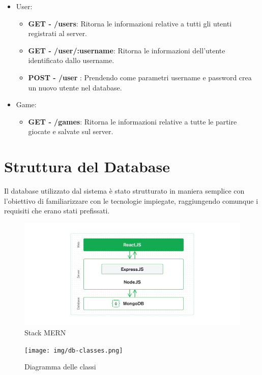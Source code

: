 \begin{itemize}
    \item User:
    \begin{itemize}
        \item \textbf{GET - /users}: Ritorna le informazioni relative a tutti gli utenti registrati al server.
        \item \textbf{GET - /user/:username}: Ritorna le informazioni dell'utente identificato dallo username.
        \item \textbf{POST - /user} : Prendendo come parametri username e password crea un nuovo utente nel database.
    \end{itemize}
    \item Game:
    \begin{itemize}
        \item \textbf{GET - /games}: Ritorna le informazioni relative a tutte le partire giocate e salvate sul server.
    \end{itemize}
            
\end{itemize}


\newpage
\section{Struttura del Database}
Il database utilizzato dal sistema è stato strutturato in maniera semplice con l'obiettivo di familiarizzare con le tecnologie impiegate, raggiungendo comunque i requisiti che erano stati prefissati.\\

\begin{figure}[H]
\centering
\includegraphics[width=\textwidth]{img/mern-stack.png}
\caption{Stack MERN \cite{mongodbMERN}}
\label{fig:mongodbmern}
\end{figure}


\begin{figure}[H]
\centering
\texttt{[image: img/db-classes.png]}
\caption{Diagramma delle classi}
\label{fig:dbClasses}
\end{figure}


